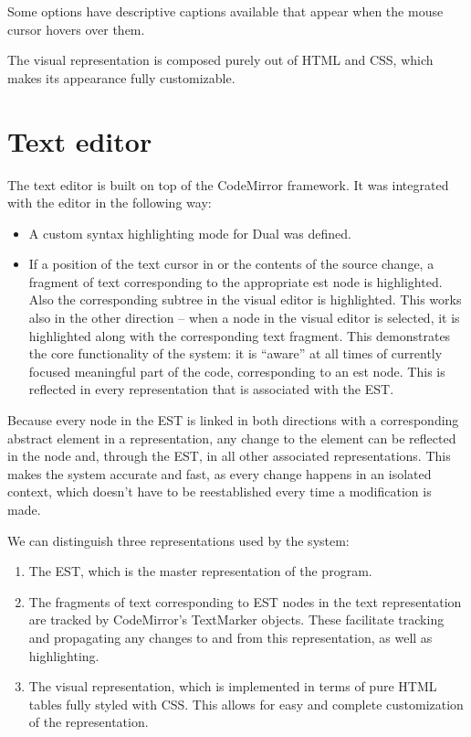 Some options have descriptive captions available that appear when the mouse
cursor hovers over them.

The visual representation is composed purely out of HTML and CSS, which makes its appearance fully customizable.

\section{Text editor}
The text editor is built on top of the CodeMirror
framework\cite{codemirror_site}. It was integrated with the
editor in the following way:
\begin{itemize}
    \item A custom syntax highlighting mode for Dual was defined.  %
    \item If a position of the text cursor in or the contents of the source
      change, a fragment of text corresponding to the appropriate \acrshort{est}
      node is highlighted. Also the corresponding subtree in the visual editor
      is highlighted. This works also in the other direction -- when a node in
      the visual editor is selected, it is highlighted along with the
      corresponding text fragment. This demonstrates the core functionality of
      the system: it is ``aware'' at all times of currently focused meaningful
      part of the code, corresponding to an \acrshort{est} node. This is
      reflected in every representation that is associated with the EST.
\end{itemize}
Because every node in the EST is linked in both directions with a corresponding
abstract element in a representation, any change to the element can be reflected
in the node and, through the EST, in all other associated representations. This
makes the system accurate and fast, as every change happens in an isolated
context, which doesn't have to be reestablished every time a modification is
made.

We can distinguish three representations used by the system:
\begin{enumerate}
    \item The EST, which is the master representation of the program.
    \item The fragments of text corresponding to EST nodes in the text
      representation are tracked by CodeMirror's TextMarker objects. These
      facilitate tracking and propagating any changes to and from this
      representation, as well as highlighting.
    \item The visual representation, which is implemented in terms of pure HTML
      tables fully styled with CSS. This allows for easy and complete
      customization of the representation.
\end{enumerate}


